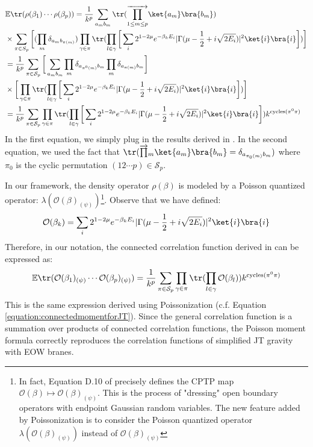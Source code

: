 \documentclass[a4paper,11pt]{article}
\theoremstyle{definition}
\numberwithin{equation}{section}
\begin{document}
\begin{align}\label{equation:connectedJT}
    \begin{split}
        &\mathbb{E}\tr(\rho(\beta_1)\cdots\rho(\beta_p)) = \frac{1}{k^p}\sum_{a_mb_m}\tr(\overrightarrow{\prod_{1\leq m\leq p}}\ket{a_m}\bra{b_m})\\&\times\sum_{\pi\in S_p}\bigg[(\prod_m\delta_{a_mb_{\pi(m)}})\prod_{\gamma\in\pi}\tr(\prod_{l\in \gamma}\bigg[\sum_i 2^{1-2\mu}e^{-\beta_kE_i}|\Gamma(\mu - \frac{1}{2} + i\sqrt{2E_i})|^2\ket{i}\bra{i}\bigg])\bigg]
        \\&
        =\frac{1}{k^p}\sum_{\pi\in\mathcal{S}_p}\bigg[\sum_{a_mb_m}\prod_m \delta_{a_{\pi^0(m)}b_m}\prod_m\delta_{a_{\pi(m)}b_m}\bigg]\\&\times\bigg[\prod_{\gamma\in\pi}\tr(\prod_{l\in \gamma}\bigg[\sum_i 2^{1-2\mu}e^{-\beta_kE_i}|\Gamma(\mu - \frac{1}{2} + i\sqrt{2E_i})|^2\ket{i}\bra{i}\bigg])\bigg]
        \\&
        =\frac{1}{k^p}\sum_{\pi\in\mathcal{S}_p}\prod_{\gamma\in\pi}\tr(\prod_{l\in \gamma}\bigg[\sum_i 2^{1-2\mu}e^{-\beta_kE_i}|\Gamma(\mu - \frac{1}{2} + i\sqrt{2E_i})|^2\ket{i}\bra{i}\bigg])k^{\text{cycles}(\pi^0\pi)}
    \end{split}
\end{align}
In the first equation, we simply plug in the results derived in \cite{Penington:2019kki}. In the second equation, we used the fact that $\tr(\overrightarrow{\prod}_m\ket{a_m}\bra{b_m} = \delta_{a_{\pi_0(m)}b_m})$ where $\pi_0$ is the cyclic permutation $(12\cdots p)\in\mathcal{S}_p$.

In our framework, the density operator $\rho(\beta)$ is modeled by a Poisson quantized operator: $\lambda(\mathcal{O}(\beta)_{(\psi)})$\footnote{In fact, Equation D.10 of \cite{Penington:2019kki} precisely defines the CPTP map $\mathcal{O}(\beta)\mapsto \mathcal{O}(\beta)_{(\psi)}$. This is the process of "dressing" open boundary operators with endpoint Gaussian random variables. The new feature added by Poissonization is to consider the Poisson quantized operator $\lambda(\mathcal{O}(\beta)_{(\psi)})$ instead of $\mathcal{O}(\beta)_{(\psi)}$}. Observe that we have defined:
\begin{equation}
    \mathcal{O}(\beta_k) = \sum_i 2^{1-2\mu}e^{-\beta_kE_i}|\Gamma(\mu - \frac{1}{2} + i\sqrt{2E_i})|^2\ket{i}\bra{i}
\end{equation}
Therefore, in our notation, the connected correlation function derived in \cite{Penington:2019kki} can be expressed as:
\begin{equation}\label{equation:corrJTEOW}
    \mathbb{E}\tr(\mathcal{O}(\beta_1)_{(\psi)}\cdots\mathcal{O}(\beta_p)_{(\psi)}) =\frac{1}{k^p}\sum_{\pi\in\mathcal{S}_p}\prod_{\gamma\in\pi}\tr(\prod_{l\in\gamma}\mathcal{O}(\beta_l))k^{\text{cycles}(\pi^0\pi)}
\end{equation}
This is the same expression derived using Poissonization (c.f. Equation \ref{equation:connectedmomentforJT}). Since the general correlation function is a summation over products of connected correlation functions, the Poisson moment formula correctly reproduces the correlation functions of simplified JT gravity with EOW branes.
\end{document}
